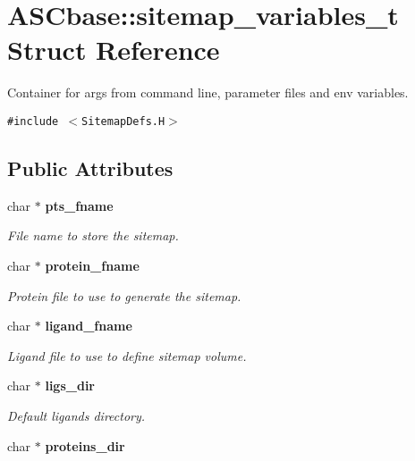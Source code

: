 \section{ASCbase::sitemap\_\-variables\_\-t Struct Reference}
\label{structASCbase_1_1sitemap__variables__t}
Container for args from command line, parameter files and env variables.  


{\tt \#include $<$Sitemap\-Defs.H$>$}

\subsection*{Public Attributes}
\begin{CompactItemize}
\item 
char $\ast$ \bf{pts\_\-fname}\label{structASCbase_1_1sitemap__variables__t_85023c58ca8199341e073b66de1309ff}

\begin{CompactList}\small\item\em File name to store the sitemap. \item\end{CompactList}\item 
char $\ast$ \bf{protein\_\-fname}\label{structASCbase_1_1sitemap__variables__t_08d611868163121dfa6083f2265f2b9a}

\begin{CompactList}\small\item\em Protein file to use to generate the sitemap. \item\end{CompactList}\item 
char $\ast$ \bf{ligand\_\-fname}\label{structASCbase_1_1sitemap__variables__t_b192da1b9c611409dda2762f266f2f8d}

\begin{CompactList}\small\item\em Ligand file to use to define sitemap volume. \item\end{CompactList}\item 
char $\ast$ \bf{ligs\_\-dir}\label{structASCbase_1_1sitemap__variables__t_9209d76febae9ba180b5da6ad237e402}

\begin{CompactList}\small\item\em Default ligands directory. \item\end{CompactList}\item 
char $\ast$ \bf{proteins\_\-dir}\label{structASCbase_1_1sitemap__variables__t_079ccca327e81108ffa7b5ebda75b72b}


\end{CompactItemize}
